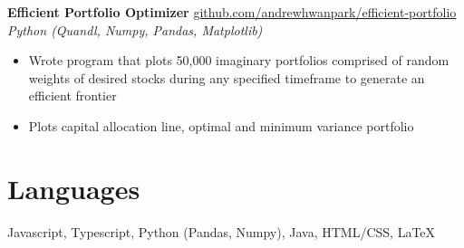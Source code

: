 \documentclass[margin]{res}
\begin{document}
\begin{resume}
	{\bf Efficient Portfolio Optimizer} \hfill \href{https://github.com/andrewhwanpark/efficient-portfolio}{github.com/andrewhwanpark/efficient-portfolio}\\
	{\it Python (Quandl, Numpy, Pandas, Matplotlib)}
	\begin{itemize} \itemsep -2pt
		\item Wrote program that plots 50,000 imaginary portfolios comprised of random weights of desired stocks during any specified timeframe to generate an efficient frontier
		\item Plots capital allocation line, optimal and minimum variance portfolio
	\end{itemize}
	
	
	\section{Languages} 
	Javascript, Typescript, Python (Pandas, Numpy), Java, HTML/CSS, \LaTeX
	
	
	
\end{resume} 
\end{document}
